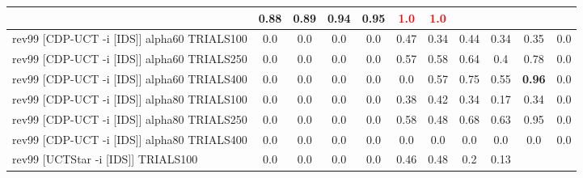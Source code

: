 \documentclass{article}
\begin{document}
\begin{tabular}{|l|r@{$\pm$}rr@{$\pm$}rr@{$\pm$}rr@{$\pm$}rr@{$\pm$}rr@{$\pm$}rr@{$\pm$}rr@{$\pm$}rr@{$\pm$}rr@{$\pm$}r|}
& \multicolumn{2}{c}{0.88}
& \multicolumn{2}{c}{0.89}
& \multicolumn{2}{c}{0.94}
& \multicolumn{2}{c}{0.95}
& \multicolumn{2}{c}{\textbf{\textcolor{red}{1.0}}}
& \multicolumn{2}{c|}{\textbf{\textcolor{red}{1.0}}}
\\
\hline
rev99 [CDP-UCT -i [IDS]] alpha60 TRIALS100
& \multicolumn{2}{c}{0.0}
& \multicolumn{2}{c}{0.0}
& \multicolumn{2}{c}{0.0}
& \multicolumn{2}{c}{0.0}
& \multicolumn{2}{c}{0.47}
& \multicolumn{2}{c}{0.34}
& \multicolumn{2}{c}{0.44}
& \multicolumn{2}{c}{0.34}
& \multicolumn{2}{c}{0.35}
& \multicolumn{2}{c|}{0.0}
\\
rev99 [CDP-UCT -i [IDS]] alpha60 TRIALS250
& \multicolumn{2}{c}{0.0}
& \multicolumn{2}{c}{0.0}
& \multicolumn{2}{c}{0.0}
& \multicolumn{2}{c}{0.0}
& \multicolumn{2}{c}{0.57}
& \multicolumn{2}{c}{0.58}
& \multicolumn{2}{c}{0.64}
& \multicolumn{2}{c}{0.4}
& \multicolumn{2}{c}{0.78}
& \multicolumn{2}{c|}{0.0}
\\
rev99 [CDP-UCT -i [IDS]] alpha60 TRIALS400
& \multicolumn{2}{c}{0.0}
& \multicolumn{2}{c}{0.0}
& \multicolumn{2}{c}{0.0}
& \multicolumn{2}{c}{0.0}
& \multicolumn{2}{c}{0.0}
& \multicolumn{2}{c}{0.57}
& \multicolumn{2}{c}{0.75}
& \multicolumn{2}{c}{0.55}
& \multicolumn{2}{c}{\textbf{0.96}}
& \multicolumn{2}{c|}{0.0}
\\
rev99 [CDP-UCT -i [IDS]] alpha80 TRIALS100
& \multicolumn{2}{c}{0.0}
& \multicolumn{2}{c}{0.0}
& \multicolumn{2}{c}{0.0}
& \multicolumn{2}{c}{0.0}
& \multicolumn{2}{c}{0.38}
& \multicolumn{2}{c}{0.42}
& \multicolumn{2}{c}{0.34}
& \multicolumn{2}{c}{0.17}
& \multicolumn{2}{c}{0.34}
& \multicolumn{2}{c|}{0.0}
\\
rev99 [CDP-UCT -i [IDS]] alpha80 TRIALS250
& \multicolumn{2}{c}{0.0}
& \multicolumn{2}{c}{0.0}
& \multicolumn{2}{c}{0.0}
& \multicolumn{2}{c}{0.0}
& \multicolumn{2}{c}{0.58}
& \multicolumn{2}{c}{0.48}
& \multicolumn{2}{c}{0.68}
& \multicolumn{2}{c}{0.63}
& \multicolumn{2}{c}{0.95}
& \multicolumn{2}{c|}{0.0}
\\
rev99 [CDP-UCT -i [IDS]] alpha80 TRIALS400
& \multicolumn{2}{c}{0.0}
& \multicolumn{2}{c}{0.0}
& \multicolumn{2}{c}{0.0}
& \multicolumn{2}{c}{0.0}
& \multicolumn{2}{c}{0.0}
& \multicolumn{2}{c}{0.0}
& \multicolumn{2}{c}{0.0}
& \multicolumn{2}{c}{0.0}
& \multicolumn{2}{c}{0.0}
& \multicolumn{2}{c|}{0.0}
\\
rev99 [UCTStar -i [IDS]] TRIALS100
& \multicolumn{2}{c}{0.0}
& \multicolumn{2}{c}{0.0}
& \multicolumn{2}{c}{0.0}
& \multicolumn{2}{c}{0.0}
& \multicolumn{2}{c}{0.46}
& \multicolumn{2}{c}{0.48}
& \multicolumn{2}{c}{0.2}
& \multicolumn{2}{c}{0.13}

\end{tabular}
\end{document}
